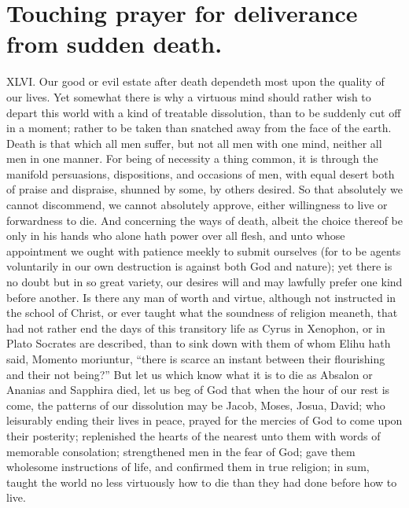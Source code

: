 \section*{Touching prayer for deliverance from sudden death.}
XLVI. Our good or evil estate after death dependeth most upon the quality of our lives. Yet somewhat there is why a virtuous mind should rather wish to depart this world with a kind of treatable dissolution, than to be suddenly cut off in a moment; rather to be taken than snatched away from the face of the earth.
Death is that which all men suffer, but not all men with one mind, neither all men in one manner. For being of necessity a thing common, it is through the manifold persuasions, dispositions, and occasions of men, with equal desert both of praise and dispraise, shunned by some, by others desired. So that absolutely we cannot discommend, we cannot absolutely approve, either willingness to live or forwardness to die.
And concerning the ways of death, albeit the choice thereof be only in his hands who alone hath power over all flesh, and unto whose appointment we ought with patience meekly to submit ourselves (for to be agents voluntarily in our own destruction is against both God and nature); yet there is no doubt but in so great variety, our desires will and may lawfully  prefer one kind before another. Is there any man of worth and virtue, although not instructed in the school of Christ, or ever taught what the soundness of religion meaneth, that had not rather end the days of this transitory life as Cyrus in Xenophon, or in Plato Socrates are described, than to sink down with them of whom Elihu hath said, Momento moriuntur, “there is scarce an instant between their flourishing and their not being?” But let us which know what it is to die as Absalon or Ananias and Sapphira died, let us beg of God that when the hour of our rest is come, the patterns of our dissolution may be Jacob, Moses, Josua, David; who leisurably ending their lives in peace, prayed for the mercies of God to come upon their posterity; replenished the hearts of the nearest unto them with words of memorable consolation; strengthened men in the fear of God; gave them wholesome instructions of life, and confirmed them in true religion; in sum, taught the world no less virtuously how to die than they had done before how to live.
